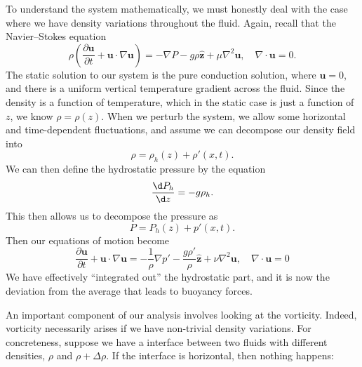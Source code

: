\documentclass[a4paper]{article}
\begin{document}
To understand the system mathematically, we must honestly deal with the case where we have density variations throughout the fluid. Again, recall that the Navier--Stokes equation
\[
  \rho\left(\frac{\partial \mathbf{u}}{\partial t} + \mathbf{u} \cdot \nabla \mathbf{u}\right) = - \nabla P- g \rho \hat{\mathbf{z}} + \mu \nabla^2 \mathbf{u},\quad \nabla \cdot \mathbf{u} = 0.
\]
The static solution to our system is the pure conduction solution, where $\mathbf{u} = 0$, and there is a uniform vertical temperature gradient across the fluid. Since the density is a function of temperature, which in the static case is just a function of $z$, we know $\rho = \rho(z)$. When we perturb the system, we allow some horizontal and time-dependent fluctuations, and assume we can decompose our density field into
\[
  \rho = \rho_h(z) + \rho'(x, t).
\]
We can then define the hydrostatic pressure by the equation
\[
  \frac{\d P_h}{\d z} = - g\rho_h.
\]
This then allows us to decompose the pressure as
\[
  P = P_h(z) + p'(x, t).
\]
Then our equations of motion become
\[
  \frac{\partial \mathbf{u}}{\partial t} + \mathbf{u} \cdot \nabla \mathbf{u} = - \frac{1}{\rho} \nabla p' - \frac{g\rho'}{\rho} \hat{\mathbf{z}} + \nu \nabla^2 \mathbf{u},\quad \nabla \cdot \mathbf{u} = 0
\]
We have effectively ``integrated out'' the hydrostatic part, and it is now the deviation from the average that leads to buoyancy forces.

An important component of our analysis involves looking at the vorticity. Indeed, vorticity necessarily arises if we have non-trivial density variations. For concreteness, suppose we have a interface between two fluids with different densities, $\rho$ and $\rho + \Delta \rho$. If the interface is horizontal, then nothing happens:
\end{document}
